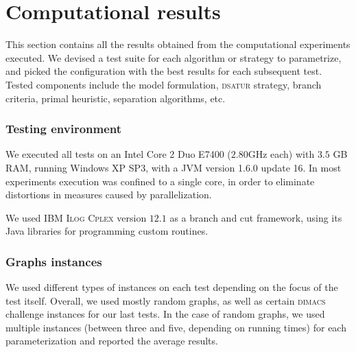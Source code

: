 
\section{Computational results}
\label{sec:results}

This section contains all the results obtained from the computational experiments executed. We devised a test suite for each algorithm or strategy to parametrize, and picked the configuration with the best results for each subsequent test. Tested components include the model formulation, \textsc{dsatur} strategy, branch criteria, primal heuristic, separation algorithms, etc.

\subsubsection*{Testing environment}

We executed all tests on an Intel Core 2 Duo E7400 ($2.80$GHz each) with $3.5$ GB RAM, running Windows XP SP3, with a JVM version 1.6.0 update 16. In most experiments execution was confined to a single core, in order to eliminate distortions in measures caused by parallelization.

We used \textsc{IBM Ilog Cplex} version $12.1$ as a branch and cut framework, using its Java libraries for programming custom routines.

\subsubsection*{Graphs instances}

We used different types of instances on each test depending on the focus of the test itself. Overall, we used mostly random graphs, as well as certain \textsc{dimacs} challenge instances\cite{dimacs} for our last tests. In the case of random graphs, we used multiple instances (between three and five, depending on running times) for each parameterization and reported the average results.  

